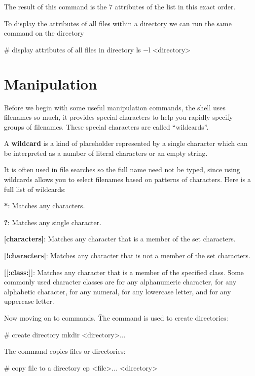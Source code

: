 The result of this command is the 7 attributes of the list in this exact order.


To display the attributes of all files within a directory we can run the same command on the directory
\begin{bash}
# display attributes of all files in directory
ls $-$l <directory>
\end{bash}

\section{Manipulation}

Before we begin with some useful manipulation commands, the shell uses filenames so much, it provides special
characters to help you rapidly specify groups of filenames. These special characters are called ``wildcards''.

\bd[Wildcard]
A \textbf{wildcard} is a kind of placeholder represented by a single character which can be interpreted as a number of
literal characters or an empty string.
\ed

It is often used in file searches so the full name need not be typed, since using wildcards allows you to select
filenames based on patterns of characters. Here is a full list of wildcards:
\bit
\item \textbf{*}: Matches any characters.
\item \textbf{?}: Matches any single character.
\item \textbf{[characters]}: Matches any character that is a member of the set characters.
\item \textbf{[!characters]}: Matches any character that is not a member of the set characters.
\item \textbf{[[:class:]]}: Matches any character that is a member of the specified class. Some commonly used character
classes are \code{[:alnum:]} for any alphanumeric character, \code{[:alpha:]} for any alphabetic character,
\code{[:digit:]} for any numeral, \code{[:lower:]} for any lowercase letter, and \code{[:upper:]} for any uppercase
letter.
\eit

Now moving on to commands. \v

The  command is used to create directories:
\begin{bash}
# create directory
mkdir <directory>...
\end{bash}

The  command copies files or directories:
\begin{bash}
# copy file to a directory
cp <file>... <directory>
\end{bash}

